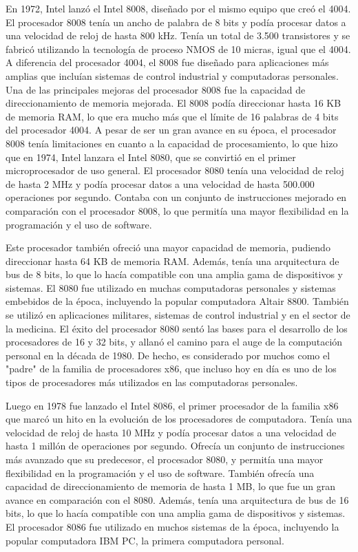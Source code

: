 \documentclass{article}
\begin{document}
En 1972, Intel lanzó el Intel 8008, diseñado por el mismo equipo que creó el 4004. El procesador 8008 tenía un ancho de palabra de 8 bits 
y podía procesar datos a una velocidad de reloj de hasta 800 kHz. Tenía un total de 3.500 transistores y se fabricó utilizando 
la tecnología de proceso NMOS de 10 micras, igual que el 4004. A diferencia del procesador 4004, el 8008 fue diseñado para aplicaciones 
más amplias que incluían sistemas de control industrial y computadoras personales.
Una de las principales mejoras del procesador 8008 fue la capacidad de direccionamiento de memoria mejorada. El 8008 podía direccionar 
hasta 16 KB de memoria RAM, lo que era mucho más que el límite de 16 palabras de 4 bits del procesador 4004.
A pesar de ser un gran avance en su época, el procesador 8008 tenía limitaciones en cuanto a la capacidad de procesamiento, 
lo que hizo que en 1974, Intel lanzara el Intel 8080, que se convirtió en el primer microprocesador de uso general. 
El procesador 8080 tenía una velocidad de reloj de hasta 2 MHz y podía procesar datos a una velocidad de hasta 500.000 
operaciones por segundo. Contaba con un conjunto de instrucciones mejorado en comparación con el procesador 8008, lo que permitía 
una mayor flexibilidad en la programación y el uso de software.\cite{Wilson2010}

Este procesador también ofreció una mayor capacidad de memoria, pudiendo direccionar hasta 64 KB de memoria RAM. Además, 
tenía una arquitectura de bus de 8 bits, lo que lo hacía compatible con una amplia gama de dispositivos y sistemas.
El 8080 fue utilizado en muchas computadoras personales y sistemas embebidos de la época, incluyendo la popular computadora Altair 8800. 
También se utilizó en aplicaciones militares, sistemas de control industrial y en el sector de la medicina. El éxito del procesador 8080 
sentó las bases para el desarrollo de los procesadores de 16 y 32 bits, y allanó el camino para el auge de la computación personal en la década de 1980. 
De hecho, es considerado por muchos como el "padre" de la familia de procesadores x86, que incluso hoy en día es uno de los tipos de procesadores 
más utilizados en las computadoras personales.

Luego en 1978 fue lanzado el Intel 8086, el primer procesador de la familia x86 que marcó un hito en la evolución de los procesadores de computadora. 
Tenía una velocidad de reloj de hasta 10 MHz y podía procesar datos a una velocidad de hasta 1 millón de operaciones por segundo. 
Ofrecía un conjunto de instrucciones más avanzado que su predecesor, el procesador 8080, y permitía una mayor flexibilidad en la programación y 
el uso de software. También ofrecía una capacidad de direccionamiento de memoria de hasta 1 MB, lo que fue un gran avance en comparación con el 8080. 
Además, tenía una arquitectura de bus de 16 bits, lo que lo hacía compatible con una amplia gama de dispositivos y sistemas.
El procesador 8086 fue utilizado en muchos sistemas de la época, incluyendo la popular computadora IBM PC, la primera computadora personal.
\end{document}
